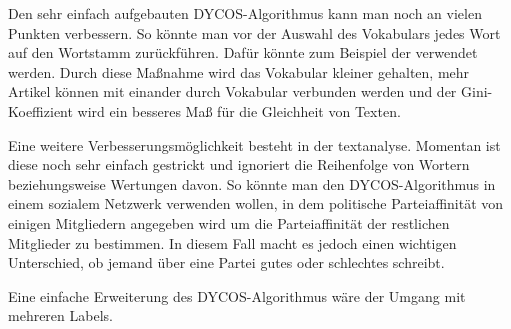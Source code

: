 Den sehr einfach aufgebauten DYCOS-Algorithmus kann man noch an
vielen Punkten verbessern. So könnte man vor der Auswahl des
Vokabulars jedes Wort auf den Wortstamm zurückführen.
Dafür könnte zum Beispiel der  verwendet 
werden. Durch diese Maßnahme wird das
Vokabular kleiner gehalten, mehr Artikel können mit einander
durch Vokabular verbunden werden und der Gini-Koeffizient wird ein
besseres Maß für die Gleichheit von Texten.

Eine weitere Verbesserungsmöglichkeit besteht in der textanalyse.
Momentan ist diese noch sehr einfach gestrickt und ignoriert die
Reihenfolge von Wortern beziehungsweise Wertungen davon. So könnte
man den DYCOS-Algorithmus in einem sozialem Netzwerk verwenden wollen,
in dem politische Parteiaffinität von einigen Mitgliedern angegeben
wird um die Parteiaffinität der restlichen Mitglieder zu bestimmen.
In diesem Fall macht es jedoch einen wichtigen Unterschied, ob jemand
über eine Partei gutes oder schlechtes schreibt.

Eine einfache Erweiterung des DYCOS-Algorithmus wäre der Umgang mit 
mehreren Labels.
